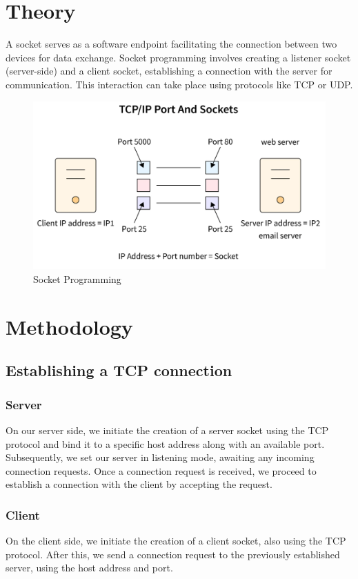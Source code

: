 \documentclass[11pt]{article}
\begin{document}
\section{Theory}
    A socket serves as a software endpoint facilitating the connection between two devices for data exchange. Socket programming involves creating a listener socket (server-side) and a client socket, establishing a connection with the server for communication. This interaction can take place using protocols like TCP or UDP.
    \begin{figure}
        \centering
        \includegraphics[width=\textwidth]{socketProgramming.png}
        \caption{Socket Programming}
        \label{fig:enter-label}
    \end{figure}

\section{Methodology}

    \subsection{Establishing a TCP connection}
        \subsubsection{Server}
        On our server side, we initiate the creation of a server socket using the TCP protocol and bind it to a specific host address along with an available port. Subsequently, we set our server in listening mode, awaiting any incoming connection requests. Once a connection request is received, we proceed to establish a connection with the client by accepting the request.
        \subsubsection{Client}
        On the client side, we initiate the creation of a client socket, also using the TCP protocol. After this, we send a connection request to the previously established server, using the host address and port.
        
\end{document}

